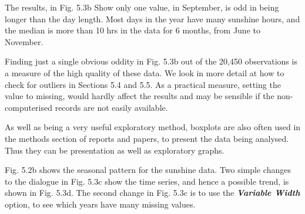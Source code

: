 \documentclass[
  letterpaper,
  DIV=11,
  numbers=noendperiod]{scrreprt}
\begin{document}
The results, in Fig. 5.3b Show only one value, in September, is odd in
being longer than the day length. Most days in the year have many
sunshine hours, and the median is more than 10 hrs in the data for 6
months, from June to November.

Finding just a single obvious oddity in Fig. 5.3b out of the 20,450
observations is a measure of the high quality of these data. We look in
more detail at how to check for outliers in Sections 5.4 and 5.5. As a
practical measure, setting the value to missing, would hardly affect the
results and may be sensible if the non-computerised records are not
easily available.

As well as being a very useful exploratory method, boxplots are also
often used in the methods section of reports and papers, to present the
data being analysed. Thus they can be presentation as well as
exploratory graphs.

Fig. 5.2b shows the seasonal pattern for the sunshine data. Two simple
changes to the dialogue in Fig. 5.3c show the time series, and hence a
possible trend, is shown in Fig. 5.3d. The second change in Fig. 5.3c is
to use the \textbf{\emph{Variable Width}} option, to see which years
have many missing values.
\end{document}
